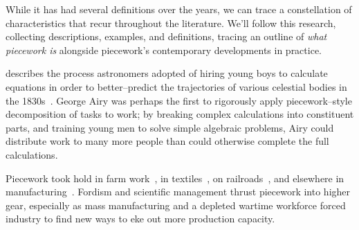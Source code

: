 \documentclass[trackingWork]{subfiles}
\begin{document}
While it has had several definitions over the years,
we can trace a constellation of characteristics that recur throughout the literature.
We'll follow this research, collecting
descriptions,
examples, and
definitions,
tracing an outline of %
\textit{what piecework is}
alongside piecework's contemporary developments in practice.

\citeauthor{grier2013computers} describes the process astronomers adopted of hiring young boys
to calculate equations in order
to better--predict the trajectories of various celestial bodies in the 1830s~\cite{grier2013computers}.
George Airy was perhaps the first to rigorously apply piecework--style decomposition of tasks to work;
by breaking complex calculations into constituent parts, and
training young men to solve simple algebraic problems,
Airy could distribute work to many more people than could otherwise complete the full calculations.


Piecework took hold in farm work~\cite{hughRaynbirdTaskWork},
in textiles~\cite{restructuringPieceworkBaker,riisOtherSideLives},
on railroads~\cite{Brown01041990}, and 
elsewhere in manufacturing~\cite{10.2307/3827491}.
Fordism and scientific management thrust piecework into higher gear, especially as
mass manufacturing and
a depleted wartime workforce forced industry to find new ways to eke out more production capacity.
\end{document}

